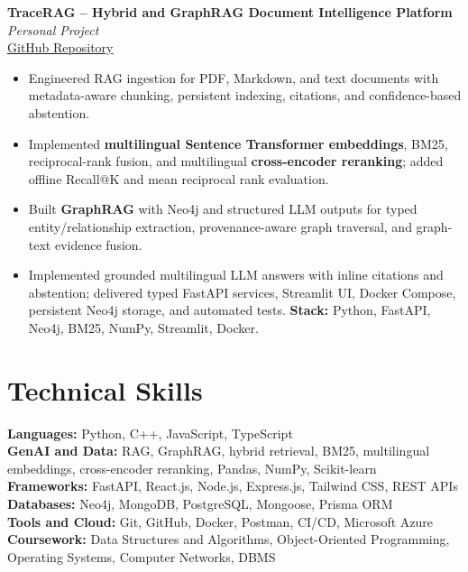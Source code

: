 \documentclass[a4paper,10pt]{article}
\newcommand{\projectHeading}[3]{
  \textbf{#1} \hfill \textit{#2}\\
  #3\\[-3pt]
}
\begin{document}
\vspace{2pt}

\projectHeading
  {TraceRAG -- Hybrid and GraphRAG Document Intelligence Platform}
  {Personal Project}
  {\href{https://github.com/ayushsotechy/TraceRAG}{GitHub Repository}}

\begin{itemize}
  \item Engineered RAG ingestion for PDF, Markdown, and text documents with
  metadata-aware chunking, persistent indexing, citations, and
  confidence-based abstention.

  \item Implemented \textbf{multilingual Sentence Transformer embeddings},
  BM25, reciprocal-rank fusion, and multilingual \textbf{cross-encoder
  reranking}; added offline Recall@K and mean reciprocal rank evaluation.

  \item Built \textbf{GraphRAG} with Neo4j and structured LLM outputs for
  typed entity/relationship extraction, provenance-aware graph traversal,
  and graph-text evidence fusion.

  \item Implemented grounded multilingual LLM answers with inline citations
  and abstention; delivered typed FastAPI services, Streamlit UI, Docker
  Compose, persistent Neo4j storage, and automated tests.
  \textbf{Stack:} Python, FastAPI, Neo4j, BM25, NumPy, Streamlit, Docker.
\end{itemize}


\section{Technical Skills}

\textbf{Languages:} Python, C++, JavaScript, TypeScript\\
\textbf{GenAI and Data:} RAG, GraphRAG, hybrid retrieval, BM25, multilingual
embeddings, cross-encoder reranking, Pandas, NumPy, Scikit-learn\\
\textbf{Frameworks:} FastAPI, React.js, Node.js, Express.js, Tailwind CSS,
REST APIs\\
\textbf{Databases:} Neo4j, MongoDB, PostgreSQL, Mongoose, Prisma ORM\\
\textbf{Tools and Cloud:} Git, GitHub, Docker, Postman, CI/CD, Microsoft Azure\\
\textbf{Coursework:} Data Structures and Algorithms, Object-Oriented
Programming, Operating Systems, Computer Networks, DBMS
\end{document}
